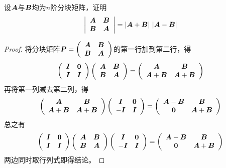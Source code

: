   \begin{li}
    设$\A$与$\B$均为$n$阶分块矩阵，证明
    $$
    \left|
      \begin{array}{cc}
        \A&\B\\
        \B&\A
      \end{array}
    \right| = |\A+\B|~|\A-\B|
    $$
  \end{li}
\begin{proof}

  将分块矩阵$
  \PP = 
  \left(
    \begin{array}{cc}
      \A&\B\\
      \B&\A
    \end{array}
  \right)$的第一行加到第二行，得
  $$
  \left(
    \begin{array}{cc}
      \II & \zero\\
      \II & \II
    \end{array}
  \right) \left(
    \begin{array}{cc}
      \A&\B\\
      \B&\A
    \end{array}
  \right) = \left(
    \begin{array}{cc}
      \A&\B\\
      \A+\B&\A+\B
    \end{array}
  \right)
  $$
  再将第一列减去第二列，得
  $$
  \left(
    \begin{array}{cc}
      \A&\B\\
      \A+\B&\A+\B
    \end{array}
  \right) \left(
    \begin{array}{cc}
      \II&\zero\\
      -\II&\II
    \end{array}
  \right) = \left(
    \begin{array}{cc}
      \A-\B & \B\\
      \zero & \A+\B
    \end{array}
  \right)
  $$
  总之有
  $$
  \left(
    \begin{array}{cc}
      \II & \zero\\
      \II & \II
    \end{array}
  \right) \left(
    \begin{array}{cc}
      \A&\B\\
      \B&\A
    \end{array}
  \right) 
  \left(
    \begin{array}{cc}
      \II&\zero\\
      -\II&\II
    \end{array}
  \right) = \left(
    \begin{array}{cc}
      \A-\B & \B\\
      \zero & \A+\B
    \end{array}
  \right)
  $$
  两边同时取行列式即得结论。
\end{proof}

